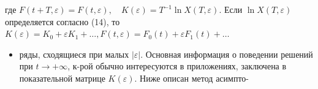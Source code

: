 \documentclass[10pt]{article}
\begin{document}
где $F(t+T, \varepsilon)=F(t, \varepsilon), \quad K(\varepsilon)=T^{-1} \ln X(T, \varepsilon)$. Если $\ln X(T, \varepsilon)$ определяется согласно (14), то $K(\varepsilon)=K_{0}+\varepsilon K_{1}+\ldots, F(t, \varepsilon)=F_{0}(t)+\varepsilon F_{1}(t)+\ldots$



\begin{itemize}

  \item ряды, сходящиеся при малых $|\varepsilon|$. Основная информация о поведении решений при $t \rightarrow+\infty$, к-рой обычно интересуются в приложениях, заключена в показательной матрице $K(\varepsilon)$. Ниже описан метод асимпто-

\end{itemize}
\end{document}
